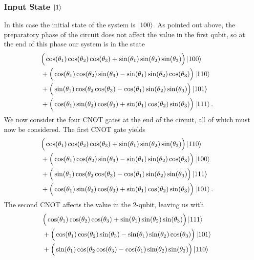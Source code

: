 \documentclass[reqno]{amsart}
\numberwithin{lemma}{section}
\numberwithin{proposition}{section}
\begin{document}
{\subsubsection{Input State $\ket{1}$}
In this case the initial state of the system is $\ket{100}$. As pointed out above, the preparatory phase of the circuit does not affect the value in the first qubit, so at the end of this phase our system is in the state
\begin{align*}
& \Big ( \cos(\theta_{1}) \cos(\theta_{2}) \cos(\theta_{3}) + \sin(\theta_{1}) \sin(\theta_{2}) \sin(\theta_{3}) \Big ) \ket{100}\\
& + \Big (\cos(\theta_{1}) \cos(\theta_{2}) \sin(\theta_{3}) - \sin(\theta_{1}) \sin(\theta_{2}) \cos(\theta_{3}) \Big ) \ket{110}\\
& + \Big ( \sin(\theta_{1}) \cos(\theta_{2} \cos(\theta_{3}) - \cos(\theta_{1}) \sin(\theta_{2}) \sin(\theta_{3}) \Big ) \ket{101}\\
& + \Big ( \cos(\theta_{1}) \sin(\theta_{2}) \cos(\theta_{3}) + \sin(\theta_{1}) \cos(\theta_{2}) \sin(\theta_{3}) \Big ) \ket{111}.
\end{align*}
We now consider the four CNOT gates at the end of the circuit, all of which must now be considered. The first CNOT gate yields
\begin{align*}
& \Big ( \cos(\theta_{1}) \cos(\theta_{2}) \cos(\theta_{3}) + \sin(\theta_{1}) \sin(\theta_{2}) \sin(\theta_{3}) \Big ) \ket{110}\\
& + \Big (\cos(\theta_{1}) \cos(\theta_{2}) \sin(\theta_{3}) - \sin(\theta_{1}) \sin(\theta_{2}) \cos(\theta_{3}) \Big ) \ket{100}\\
& + \Big ( \sin(\theta_{1}) \cos(\theta_{2} \cos(\theta_{3}) - \cos(\theta_{1}) \sin(\theta_{2}) \sin(\theta_{3}) \Big ) \ket{111}\\
& + \Big ( \cos(\theta_{1}) \sin(\theta_{2}) \cos(\theta_{3}) + \sin(\theta_{1}) \cos(\theta_{2}) \sin(\theta_{3}) \Big ) \ket{101}.
\end{align*}
The second CNOT affects the value in the $2$-qubit, leaving us with
\begin{align*}
& \Big ( \cos(\theta_{1}) \cos(\theta_{2}) \cos(\theta_{3}) + \sin(\theta_{1}) \sin(\theta_{2}) \sin(\theta_{3}) \Big ) \ket{111}\\
& + \Big (\cos(\theta_{1}) \cos(\theta_{2}) \sin(\theta_{3}) - \sin(\theta_{1}) \sin(\theta_{2}) \cos(\theta_{3}) \Big ) \ket{101}\\
& + \Big ( \sin(\theta_{1}) \cos(\theta_{2} \cos(\theta_{3}) - \cos(\theta_{1}) \sin(\theta_{2}) \sin(\theta_{3}) \Big ) \ket{110}\\

\end{align*}}
\end{document}
